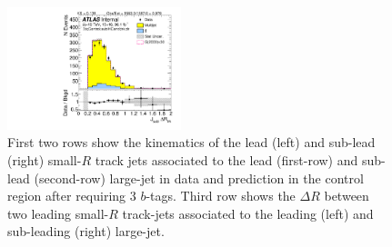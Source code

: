 \begin{figure}[htbp!]
\begin{center}
\includegraphics[width=0.45\textwidth,angle=-90]{figures/boosted/Control/b77_ThreeTag_Control_sublHCand_trk_dr.pdf}
  \caption{First two rows show the kinematics of the lead (left) and sub-lead (right) small-$R$ track jets associated to the lead (first-row) and sub-lead (second-row) large-\R jet in data and prediction in the control region after requiring 3 $b$-tags. Third row shows the $\Delta R$ between two leading small-$R$ track-jets associated to the leading (left) and sub-leading (right) large-\R jet.  }
  \label{fig:boosted-3b-control-ak2}
\end{center}
\end{figure}


